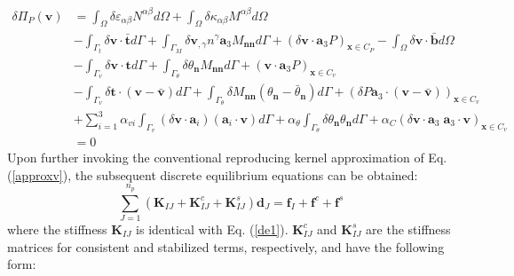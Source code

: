 \begin{equation}
\begin{split}
\delta \Pi_P(\boldsymbol v) &= \int_\Omega\delta \varepsilon_{\alpha\beta} N^{\alpha\beta} d\Omega +
\int_\Omega \delta \kappa_{\alpha\beta}M^{\alpha\beta} d\Omega \\
                     &- \int_{\Gamma_t} \delta \boldsymbol v \cdot \bar{\boldsymbol t} d\Gamma 
                     + \int_{\Gamma_M} \delta \boldsymbol v_{,\gamma} n^\gamma \boldsymbol a_3 M_{\boldsymbol{nn}} d\Gamma
                     + (\delta \boldsymbol v \cdot \boldsymbol a_3 P)_{\boldsymbol x \in C_P}
                     - \int_\Omega \delta \boldsymbol v \cdot \bar{\boldsymbol b} d\Omega \\
                     &- \int_{\Gamma_v} \delta \boldsymbol v \cdot \boldsymbol t d\Gamma 
                     + \int_{\Gamma_\theta} \delta \theta_{\boldsymbol n} M_{\boldsymbol{nn}}d\Gamma 
                     + (\boldsymbol v \cdot \boldsymbol a_3 P)_{\boldsymbol x \in C_v}\\
                     &- \int_{\Gamma_v} \delta \boldsymbol t \cdot (\boldsymbol v - \bar{\boldsymbol v}) d\Gamma
                     + \int_{\Gamma_\theta} \delta M_{\boldsymbol{nn}}(\theta_{\boldsymbol n} - \bar \theta_{\boldsymbol n})d\Gamma
                     + (\delta P\boldsymbol a_3 \cdot (\boldsymbol v - \bar{\boldsymbol v}))_{\boldsymbol x \in C_v} \\
                     &+ \sum_{i=1}^{3}\alpha_{vi} \int_{\Gamma_v} (\delta \boldsymbol v \cdot \boldsymbol a_i) (\boldsymbol a_i \cdot \boldsymbol v) d\Gamma 
                     + \alpha_\theta \int_{\Gamma_\theta} \delta \theta_{\boldsymbol n}\theta_{\boldsymbol n} d\Gamma
                     + \alpha_C(\delta \boldsymbol v \cdot \boldsymbol a_3 \; \boldsymbol a_3 \cdot \boldsymbol v)_{\boldsymbol x\in C_v} \\
                     &= 0
\end{split}
\end{equation}
Upon further invoking the conventional reproducing kernel approximation of Eq. (\ref{approxv}), the subsequent discrete equilibrium equations can be obtained:
\begin{equation}
\sum_{J=1}^{n_p}(\boldsymbol K_{IJ} + \boldsymbol K^c_{IJ} + \boldsymbol K^s_{IJ}) \boldsymbol d_J = \boldsymbol f_I + \boldsymbol f^c + \boldsymbol f^s
\end{equation}
where the stiffness $\boldsymbol K_{IJ}$ is identical with Eq. (\ref{de1}). $\boldsymbol K^c_{IJ}$ and $\boldsymbol K^s_{IJ}$ are the stiffness matrices for consistent and stabilized terms, respectively, and have the following form:

